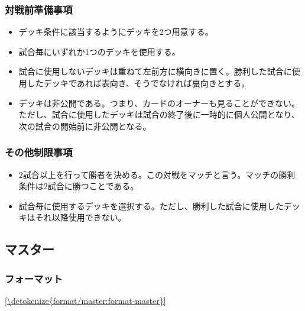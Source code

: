 \documentclass[letterpaper,10pt,dvipdfmx]{sphinxmanual}
\begin{document}
\subsubsection{対戦前準備事項}
\label{\detokenize{match-regulations/pro_randomhalf:id4}}\begin{itemize}
\item {} 
\sphinxAtStartPar
デッキ条件に該当するようにデッキを2つ用意する。

\item {} 
\sphinxAtStartPar
試合毎にいずれか1つのデッキを使用する。

\item {} 
\sphinxAtStartPar
試合に使用しないデッキは重ねて左前方に横向きに置く。勝利した試合に使用したデッキであれば表向き、そうでなければ裏向きとする。

\item {} 
\sphinxAtStartPar
デッキは非公開である。つまり、カードのオーナーも見ることができない。ただし、試合に使用したデッキは試合の終了後に一時的に個人公開となり、次の試合の開始前に非公開となる。

\end{itemize}


\subsubsection{その他制限事項}
\label{\detokenize{match-regulations/pro_randomhalf:id5}}\begin{itemize}
\item {} 
\sphinxAtStartPar
2試合以上を行って勝者を決める。この対戦をマッチと言う。マッチの勝利条件は2試合に勝つことである。

\item {} 
\sphinxAtStartPar
試合毎に使用するデッキを選択する。ただし、勝利した試合に使用したデッキはそれ以降使用できない。

\end{itemize}

\sphinxstepscope


\subsection{マスター}
\label{\detokenize{match-regulations/master:id1}}\label{\detokenize{match-regulations/master::doc}}

\subsubsection{フォーマット}
\label{\detokenize{match-regulations/master:id2}}
\sphinxAtStartPar
\hyperref[\detokenize{format/master:format-master}]{\ref{\detokenize{format/master:format-master}} }
\end{document}
